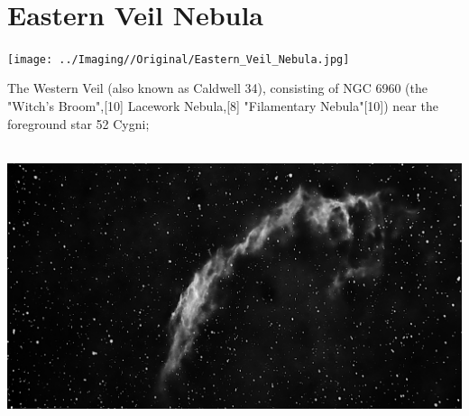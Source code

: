 \ \\\section{Eastern Veil Nebula}
\texttt{[image: ../Imaging//Original/Eastern\_Veil\_Nebula.jpg]}
{\footnotesize\color{white}
The Western Veil (also known as Caldwell 34), consisting of NGC 6960 (the "Witch's Broom",[10] Lacework Nebula,[8] "Filamentary Nebula"[10]) near the foreground star 52 Cygni;


}\ \\
\includegraphics[width=\textwidth]{../Imaging//Grayscale/Eastern_Veil_Nebula.jpg}
